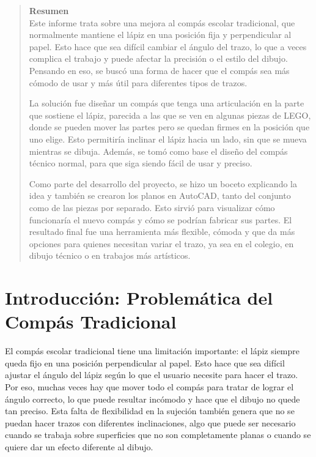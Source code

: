 \documentclass[11pt, a4paper]{article}
\begin{document}
\begin{abstract}
    \noindent \textbf{Resumen} \\
    Este informe trata sobre una mejora al compás escolar tradicional, que normalmente mantiene el lápiz en una posición fija y perpendicular al papel. Esto hace que sea difícil cambiar el ángulo del trazo, lo que a veces complica el trabajo y puede afectar la precisión o el estilo del dibujo. Pensando en eso, se buscó una forma de hacer que el compás sea más cómodo de usar y más útil para diferentes tipos de trazos.

    La solución fue diseñar un compás que tenga una articulación en la parte que sostiene el lápiz, parecida a las que se ven en algunas piezas de LEGO, donde se pueden mover las partes pero se quedan firmes en la posición que uno elige. Esto permitiría inclinar el lápiz hacia un lado, sin que se mueva mientras se dibuja. Además, se tomó como base el diseño del compás técnico normal, para que siga siendo fácil de usar y preciso.

    Como parte del desarrollo del proyecto, se hizo un boceto explicando la idea y también se crearon los planos en AutoCAD, tanto del conjunto como de las piezas por separado. Esto sirvió para visualizar cómo funcionaría el nuevo compás y cómo se podrían fabricar sus partes. El resultado final fue una herramienta más flexible, cómoda y que da más opciones para quienes necesitan variar el trazo, ya sea en el colegio, en dibujo técnico o en trabajos más artísticos.
\end{abstract}

\newpage
\tableofcontents
\newpage

\section{Introducción: Problemática del Compás Tradicional}
El compás escolar tradicional tiene una limitación importante: el lápiz siempre queda fijo en una posición perpendicular al papel. Esto hace que sea difícil ajustar el ángulo del lápiz según lo que el usuario necesite para hacer el trazo. Por eso, muchas veces hay que mover todo el compás para tratar de lograr el ángulo correcto, lo que puede resultar incómodo y hace que el dibujo no quede tan preciso. Esta falta de flexibilidad en la sujeción también genera que no se puedan hacer trazos con diferentes inclinaciones, algo que puede ser necesario cuando se trabaja sobre superficies que no son completamente planas o cuando se quiere dar un efecto diferente al dibujo.
\end{document}
